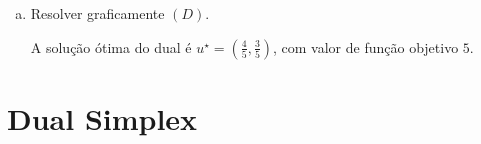 \documentclass[12pt]{exam}
\begin{document}
\begin{questions}
\begin{enumerate}[a)]
\begin{solution}
		\end{solution}		
		\item Resolver graficamente $(D)$. 
			\begin{solution}
				\begin{center}
				\end{center}
			A solução ótima do dual é $u^{\star} = (\frac{4}{5},\frac{3}{5})$, com valor de função objetivo $5$.
			\end{solution}
	\end{enumerate}

\section*{Dual Simplex}



\end{questions}
\end{document}
